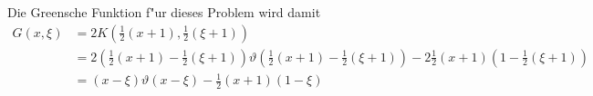 \begin{loesung}
Die Greensche Funktion f"ur dieses Problem wird damit
\begin{align*}
G(x,\xi)&=
2K({\textstyle\frac12}(x+1),{\textstyle\frac12}(\xi+1))
\\
&=
2
({\textstyle\frac12}(x+1)-\textstyle{\frac12}(\xi+1))
\vartheta({\textstyle\frac12}(x+1)-{\textstyle\frac12}(\xi+1))
-2{\textstyle\frac12}(x+1)(1-{\textstyle\frac12}(\xi+1))
\\
&=
(x-\xi)\vartheta(x-\xi)-{\textstyle\frac12}(x+1)(1-\xi)
\end{align*}
\end{loesung}
